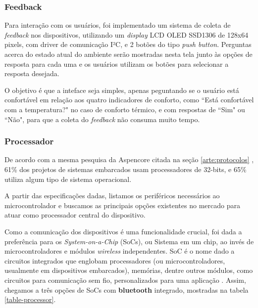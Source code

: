 \documentclass[../monografia.tex]{subfiles}
\begin{document}
\subsubsection{Feedback}

Para interação com os usuários, foi implementado um sistema de coleta de \textit{feedback} nos dispositivos, utilizando um \textit{display} LCD OLED SSD1306 \cite{oled} de 128x64 pixels, com driver de comunicação I²C, e 2 botões do tipo \textit{push button}. Perguntas acerca do estado atual do ambiente serão mostradas nesta tela junto às opções de resposta para cada uma e os usuários utilizam os botões para selecionar a resposta desejada.

O objetivo é que a inteface seja simples, apenas peguntando se o usuário está confortável em relação aos quatro indicadores de conforto, como ``Está confortável com a temperatura?" no caso de conforto térmico, e com respostas de ``Sim" ou ``Não", para que a coleta do \textit{feedback} não consuma muito tempo.

\subsubsection{Processador}

De acordo com a mesma pesquisa da Aspencore citada na seção \ref{arte:protocolos} \cite{embedded-market-study}, 61\% dos projetos de sistemas embarcados usam processadores de 32-bits, e 65\% utiliza algum tipo de sistema operacional. 

A partir das especificações dadas, listamos os periféricos necessários ao microcontrolador e buscamos as principais opções existentes no mercado para atuar como processador central do dispositivo. 

Como a comunicação dos dispositivos é uma funcionalidade crucial, foi dada a preferência para os \textit{System-on-a-Chip} (SoCs), ou Sistema em um chip, ao invés de microcontroladores e módulos \textit{wireless} independentes. SoC é o nome dado a circuitos integrados que englobam processadores (ou microcontroladores, usualmente em dispositivos embarcados), memórias, dentre outros módulos, como circuitos para comunicação sem fio, personalizados para uma aplicação \cite{soc}. Assim, chegamos a três opções de SoCs com \textbf{bluetooth} integrado, mostradas na tabela \ref{table-processor}.
\end{document}
